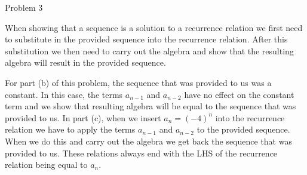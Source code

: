 \begin{problem}{Problem 3}
\begin{Highlight}[Solution - \#12]
        When showing that a sequence is a solution to a recurrence relation we first need to substitute in the provided sequence into the recurrence relation. After this substitution we then need to
        carry out the algebra and show that the resulting algebra will result in the provided sequence.

        For part (b) of this problem, the sequence that was provided to us was a constant. In this case, the terms $a_{n-1}$ and $a_{n-2}$ have no effect on the constant term and we show that resulting
        algebra will be equal to the sequence that was provided to us. In part (c), when we insert $a_{n} = (-4)^{n}$ into the recurrence relation we have to apply the terms $a_{n-1}$ and $a_{n-2}$ to 
        the provided sequence. When we do this and carry out the algebra we get back the sequence that was provided to us. These relations always end with the LHS of the recurrence relation being equal
        to $a_{n}$.
    \end{Highlight}
\end{problem}


